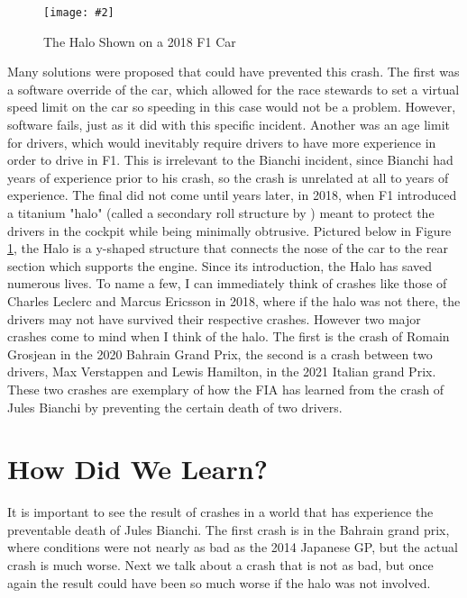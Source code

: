 \documentclass[letterpaper, 12pt]{article}
\numberwithin{figure}{section}
\newcommand{\figref}[4]
{
  \begin{figure}[H]
    \centering
    \texttt{[image: \#2]}
    \caption{#3}
    #4
  \end{figure}
}
\begin{document}
\figref{5.0}{halo}{The Halo Shown on a 2018 F1 Car \cite{halopic}}{\label{fig:1}}
Many solutions were proposed that could have prevented this crash. The first was a software override of the car, which allowed for the race stewards to set a virtual speed limit on the car so speeding in this case would not be a problem. However, software fails, just as it did with this specific incident. Another was an age limit for drivers, which would inevitably require drivers to have more experience in order to drive in F1. This is irrelevant to the Bianchi incident, since Bianchi had years of experience prior to his crash, so the crash is unrelated at all to years of experience. The final did not come until years later, in 2018, when F1 introduced a titanium "halo" (called a secondary roll structure by \cite{fia2018}) meant to protect the drivers in the cockpit while being minimally obtrusive. Pictured below in Figure \ref{fig:1}, the Halo is a y-shaped structure that connects the nose of the car to the rear section which supports the engine. 
Since its introduction, the Halo has saved numerous lives. To name a few, I can immediately think of crashes like those of Charles Leclerc and Marcus Ericsson in 2018, where if the halo was not there, the drivers may not have survived their respective crashes. However two major crashes come to mind when I think of the halo. The first is the crash of Romain Grosjean in the 2020 Bahrain Grand Prix, the second is a crash between two drivers, Max Verstappen and Lewis Hamilton, in the 2021 Italian grand Prix. These two crashes are exemplary of how the FIA has learned from the crash of Jules Bianchi by preventing the certain death of two drivers. 
\section{How Did We Learn?}
It is important to see the result of crashes in a world that has experience the preventable death of Jules Bianchi. The first crash is in the Bahrain grand prix, where conditions were not nearly as bad as the 2014 Japanese GP, but the actual crash is much worse. Next we talk about a crash that is not as bad, but once again the result could have been so much worse if the halo was not involved.
\end{document}
